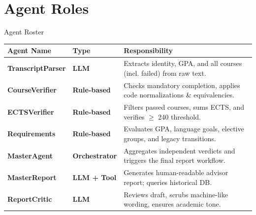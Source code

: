 \documentclass[aspectratio=169]{beamer}
\begin{document}
\section{Agent Roles}

\begin{frame}{Agent Roster}
  \small
  \renewcommand{\arraystretch}{1.3}
  \begin{tabularx}{\linewidth}{@{} p{3.2cm} p{2.2cm} X @{}}
    \toprule
    \textbf{Agent Name} & \textbf{Type} & \textbf{Responsibility} \\
    \midrule
    \textbf{TranscriptParser} & \textcolor{agentblue}{\bfseries LLM} & Extracts identity, GPA, and all courses (incl. failed) from raw text. \\
    \textbf{CourseVerifier} & \textcolor{agentgreen}{\bfseries Rule-based} & Checks mandatory completion, applies code normalizations \& equivalencies. \\
    \textbf{ECTSVerifier} & \textcolor{agentgreen}{\bfseries Rule-based} & Filters passed courses, sums ECTS, and verifies $\geq$ 240 threshold. \\
    \textbf{Requirements} & \textcolor{agentgreen}{\bfseries Rule-based} & Evaluates GPA, language goals, elective groups, and legacy transitions. \\
    \textbf{MasterAgent} & \textcolor{agentorange}{\bfseries Orchestrator} & Aggregates independent verdicts and triggers the final report workflow. \\
    \textbf{MasterReport} & \textcolor{agentblue}{\bfseries LLM + Tool} & Generates human-readable advisor report; queries historical DB. \\
    \textbf{ReportCritic} & \textcolor{agentblue}{\bfseries LLM} & Reviews draft, scrubs machine-like wording, ensures academic tone. \\
    \bottomrule
  \end{tabularx}
\end{frame}
\end{document}
